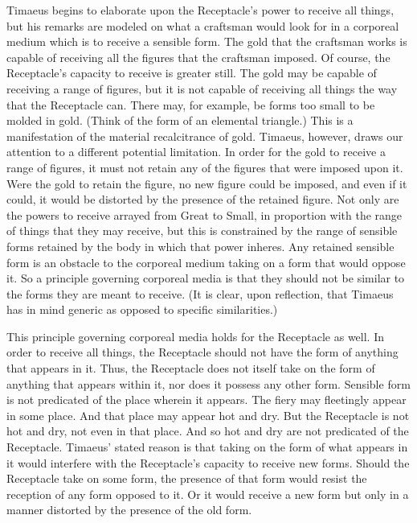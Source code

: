 
Timaeus begins to elaborate upon the Receptacle's power to receive all things, but his remarks are modeled on what a craftsman would look for in a corporeal medium which is to receive a sensible form. The gold that the craftsman works is capable of receiving all the figures that the craftsman imposed. Of course, the Receptacle's capacity to receive is greater still. The gold may be capable of receiving a range of figures, but it is not capable of receiving all things the way that the Receptacle can. There may, for example, be forms too small to be molded in gold. (Think of the form of an elemental triangle.) This is a manifestation of the material recalcitrance of gold. Timaeus, however, draws our attention to a different potential limitation. In order for the gold to receive a range of figures, it must not retain any of the figures that were imposed upon it. Were the gold to retain the figure, no new figure could be imposed, and even if it could, it would be distorted by the presence of the retained figure. Not only are the powers to receive arrayed from Great to Small, in proportion with the range of things that they may receive, but this is constrained by the range of sensible forms retained by the body in which that power inheres. Any retained sensible form is an obstacle to the corporeal medium taking on a form that would oppose it. So a principle governing corporeal media is that they should not be similar to the forms they are meant to receive. (It is clear, upon reflection, that Timaeus has in mind generic as opposed to specific similarities.)

This principle governing corporeal media holds for the Receptacle as well. In order to receive all things, the Receptacle should not have the form of anything that appears in it. Thus, the Receptacle does not itself take on the form of anything that appears within it, nor does it possess any other form. Sensible form is not predicated of the place wherein it appears. The fiery may fleetingly appear in some place. And that place may appear hot and dry. But the Receptacle is not hot and dry, not even in that place. And so hot and dry are not predicated of the Receptacle. Timaeus' stated reason is that taking on the form of what appears in it would interfere with the Receptacle's capacity to receive new forms. Should the Receptacle take on some form, the presence of that form would resist the reception of any form opposed to it. Or it would receive a new form but only in a manner distorted by the presence of the old form.

